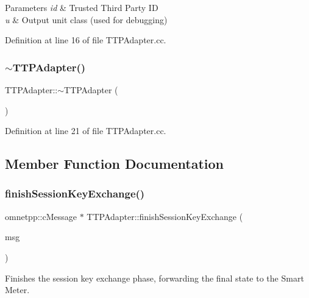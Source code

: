 \begin{DoxyParams}{Parameters}
{\em id} & Trusted Third Party ID \\
\hline
{\em u} & Output unit class (used for debugging) \\
\hline
\end{DoxyParams}


Definition at line 16 of file T\+T\+P\+Adapter.\+cc.

\mbox{\label{classTTPAdapter_aac9a02ae55c0ba9752869e5c7f1a3d79}} 
\subsubsection{\texorpdfstring{$\sim$\+T\+T\+P\+Adapter()}{~TTPAdapter()}}
{\footnotesize\ttfamily T\+T\+P\+Adapter\+::$\sim$\+T\+T\+P\+Adapter (\begin{DoxyParamCaption}{ }\end{DoxyParamCaption})}



Definition at line 21 of file T\+T\+P\+Adapter.\+cc.



\subsection{Member Function Documentation}
\mbox{\label{classTTPAdapter_a3cfb4c68f5a6bf562584f7710b411e4a}} 
\subsubsection{\texorpdfstring{finish\+Session\+Key\+Exchange()}{finishSessionKeyExchange()}}
{\footnotesize\ttfamily omnetpp\+::c\+Message $\ast$ T\+T\+P\+Adapter\+::finish\+Session\+Key\+Exchange (\begin{DoxyParamCaption}\item[{omnetpp\+::c\+Message $\ast$}]{msg }\end{DoxyParamCaption})}

Finishes the session key exchange phase, forwarding the final state to the Smart Meter. 

